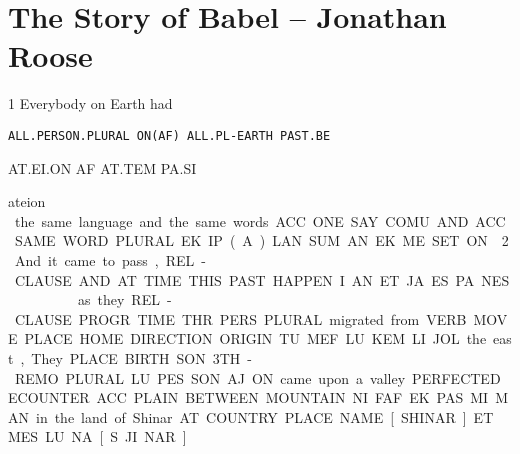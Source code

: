 
\section{The Story of Babel -- {\small Jonathan Roose}}
{
\baselineskip

1 Everybody		on 	Earth 		had

{\tt ALL.PERSON.PLURAL   	ON(AF)	ALL.PL-EARTH	PAST.BE	 }

AT.EI.ON		AF	AT.TEM		PA.SI	 

ateion		\af	\at\tem		\pa\si	 

\vspace{0.2cm}

the same language	 and 	the same words. 

ACC.ONE.SAY.COMU.	AND.	ACC.SAME.WORD.PLURAL 

EK.IP.(A).LAN.SUM	AN	EK.ME.SET.ON

\vspace{0.5cm}

2 And	 		it came to pass, 			  

REL-CLAUSE.AND            AT.TIME.THIS.PAST.HAPPEN.		

I.AN			ET.JA.ES.PA.NES				 

\Atlani\an                    \et\ja\es\pa\nes

\def\drie{\vspace{0.3cm}}
\drie

as	they	    

REL-CLAUSE.PROGR.TIME	THR.PERS.PLURAL 



migrated          			from      		 VERB.MOVE.PLACE.HOME	DIRECTION.ORIGIN	 

TU.MEF.LU.KEM			LI.JOL 

 

the east, 		They 		 

PLACE.BIRTH.SON	3TH-REMO.PLURAL 

LU.PES.SON		AJ.ON 

  

came upon 		a valley                 

PERFECTED.ECOUNTER  	ACC.PLAIN.BETWEEN.MOUNTAIN.	NI.FAF                                EK.PAS.MI.MAN 

  

in the land          of Shinar 

AT.COUNTRY	PLACE.NAME.[SHINAR] 

ET.MES		LU.NA.[S.JI.NAR] 

}
